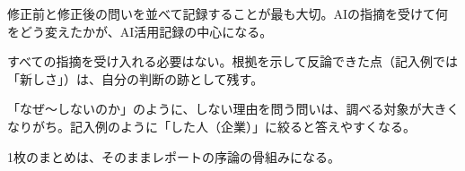 \begin{point}
  \item 修正前と修正後の問いを並べて記録することが最も大切。AIの指摘を受けて何をどう変えたかが、AI活用記録の中心になる。
  \item すべての指摘を受け入れる必要はない。根拠を示して反論できた点（記入例では「新しさ」）は、自分の判断の跡として残す。
  \item 「なぜ〜しないのか」のように、しない理由を問う問いは、調べる対象が大きくなりがち。記入例のように「した人（企業）」に絞ると答えやすくなる。
  \item 1枚のまとめは、そのままレポートの序論の骨組みになる。
\end{point}
